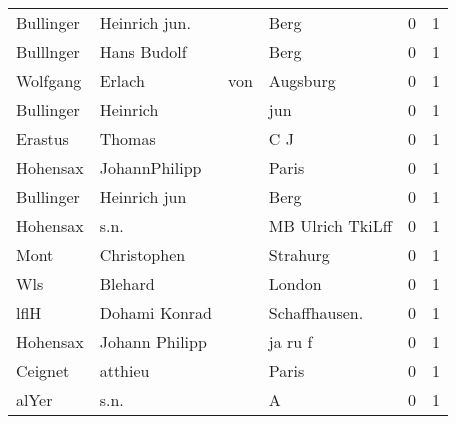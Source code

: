 \documentclass[10pt,a4paper,landscape]{article}
\begin{document}
\begin{longtable}{llllrr}
                Bullinger &                      Heinrich jun. &             &                                        Berg &          0 &         1 \\
                Bulllnger &                        Hans Budolf &             &                                        Berg &          0 &         1 \\
                 Wolfgang &                             Erlach &         von &                                    Augsburg &          0 &         1 \\
                Bullinger &                           Heinrich &             &                                         jun &          0 &         1 \\
                  Erastus &                             Thomas &             &                                         C J &          0 &         1 \\
                 Hohensax &                      JohannPhilipp &             &                                       Paris &          0 &         1 \\
                Bullinger &                       Heinrich jun &             &                                        Berg &          0 &         1 \\
                 Hohensax &                               s.n. &             &                            MB Ulrich TkiLff &          0 &         1 \\
                     Mont &                        Christophen &             &                                    Strahurg &          0 &         1 \\
                      Wls &                            Blehard &             &                                      London &          0 &         1 \\
                     lflH &                      Dohami Konrad &             &                              Schaffhausen.  &          0 &         1 \\
                 Hohensax &                     Johann Philipp &             &                                     ja ru f &          0 &         1 \\
                  Ceignet &                            atthieu &             &                                       Paris &          0 &         1 \\
                    alYer &                               s.n. &             &                                           A &          0 &         1 \\

\end{longtable}
\end{document}
